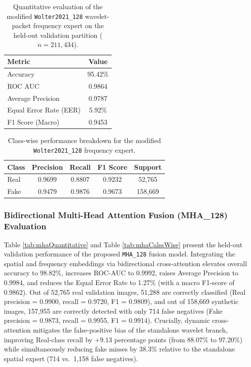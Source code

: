 \documentclass[fleqn,10pt]{wlscirep}
\begin{document}
\begin{table}[htbp]
\centering
\begin{tabular}{|l|c|}
\hline
\textbf{Metric} & \textbf{Value} \\
\hline
Accuracy & 95.42\% \\
ROC AUC & 0.9864 \\
Average Precision & 0.9787 \\
Equal Error Rate (EER) & 5.92\% \\
F1 Score (Macro) & 0.9453 \\
\hline
\end{tabular}
\caption{\label{tab:waveletsModQuanti}Quantitative evaluation of the modified \texttt{Wolter2021\_128} wavelet-packet frequency expert on the held-out validation partition ($n=211{,}434$).}
\end{table}

\begin{table}[htbp]
\centering
\begin{tabular}{|l|c|c|c|c|}
\hline
\textbf{Class} & \textbf{Precision} & \textbf{Recall} & \textbf{F1 Score} & \textbf{Support} \\
\hline
Real & 0.9699 & 0.8807 & 0.9232 & 52{,}765 \\
Fake & 0.9479 & 0.9876 & 0.9673 & 158{,}669 \\
\hline
\end{tabular}
\caption{\label{tab:modWaveleteClasswise}Class-wise performance breakdown for the modified \texttt{Wolter2021\_128} frequency expert.}
\end{table}

\subsubsection*{Bidirectional Multi-Head Attention Fusion (MHA\_128) Evaluation}
\label{subsec:mha_eval}
Table \ref{tab:mhaQuantitative} and Table \ref{tab:mhaCalssWise} present the held-out validation performance of the proposed \texttt{MHA\_128} fusion model. Integrating the spatial and frequency embeddings via bidirectional cross-attention elevates overall accuracy to 98.82\%, increases ROC-AUC to 0.9992, raises Average Precision to 0.9984, and reduces the Equal Error Rate to 1.27\% (with a macro F1-score of 0.9862). Out of 52,765 real validation images, 51,288 are correctly classified (Real precision = 0.9900, recall = 0.9720, F1 = 0.9809), and out of 158,669 synthetic images, 157,955 are correctly detected with only 714 false negatives (Fake precision = 0.9873, recall = 0.9955, F1 = 0.9914). Crucially, dynamic cross-attention mitigates the false-positive bias of the standalone wavelet branch, improving Real-class recall by $+9.13$ percentage points (from 88.07\% to 97.20\%) while simultaneously reducing fake misses by 38.3\% relative to the standalone spatial expert (714 vs.\ 1,158 false negatives).
\end{document}
